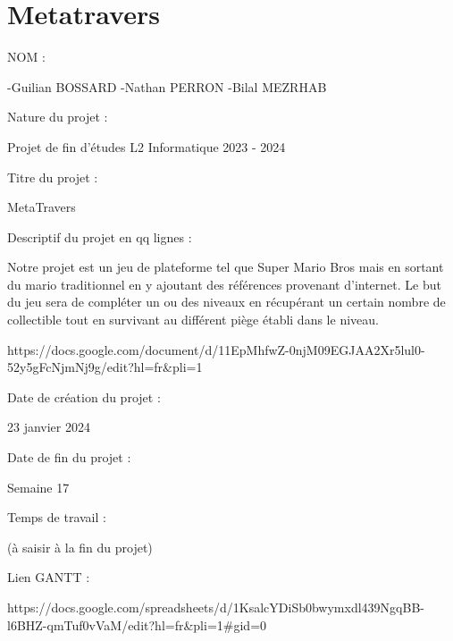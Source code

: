 \chapter{Metatravers}
\hypertarget{index}{}\label{index}
\label{index_md__2info_2etu_2l2info_2s2201668_2Projet__Jeu__L2_2projetL2_2README}%
%
 NOM \+: \begin{DoxyVerb}-Guilian BOSSARD
-Nathan PERRON
-Bilal MEZRHAB
\end{DoxyVerb}
 Nature du projet \+: \begin{DoxyVerb}Projet de fin d'études L2 Informatique 2023 - 2024
\end{DoxyVerb}
 Titre du projet \+: \begin{DoxyVerb}MetaTravers
\end{DoxyVerb}
 Descriptif du projet en qq lignes \+: \begin{DoxyVerb}Notre projet est un jeu de plateforme tel que Super Mario Bros mais en sortant du mario traditionnel en y ajoutant des références provenant d'internet. 
Le but du jeu sera de compléter un ou des niveaux en récupérant un certain nombre de collectible tout en survivant au différent piège établi dans le niveau.


https://docs.google.com/document/d/11EpMhfwZ-0njM09EGJAA2Xr5lul0-52y5gFcNjmNj9g/edit?hl=fr&pli=1 
\end{DoxyVerb}


Date de création du projet \+: \begin{DoxyVerb}23 janvier 2024
\end{DoxyVerb}


Date de fin du projet \+: \begin{DoxyVerb}Semaine 17
\end{DoxyVerb}


Temps de travail \+: \begin{DoxyVerb}(à saisir à la fin du projet)
\end{DoxyVerb}


Lien GANTT \+: \begin{DoxyVerb}https://docs.google.com/spreadsheets/d/1KsalcYDiSb0bwymxdl439NgqBB-l6BHZ-qmTuf0vVaM/edit?hl=fr&pli=1#gid=0
\end{DoxyVerb}
 